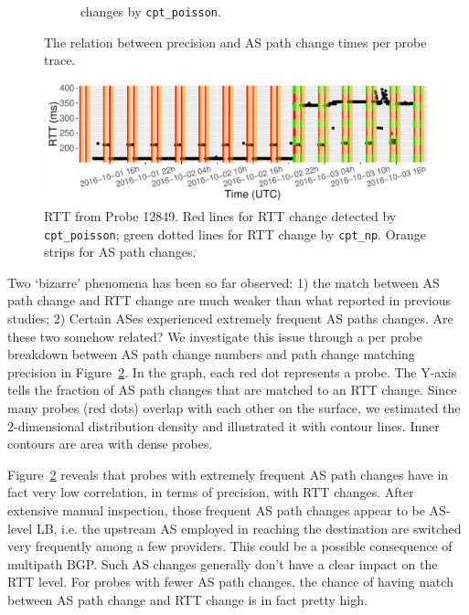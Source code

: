 \begin{figure}[!htb]
\begin{subfigure}[b]{.48\textwidth}
	\caption{\footnotesize changes by \texttt{cpt\_poisson}.}
	\label{fig:as_path_ch_precision_poisson}
	\end{subfigure}
\caption{The relation between precision and AS path change times per probe trace.}
\label{fig:as_path_ch_precision}
\end{figure}

\begin{figure}[!htb]
\centering
\includegraphics[width=.96\textwidth]{gfx/chap4/case_12849.pdf}
\caption{RTT from Probe 12849. Red lines for RTT change detected by \texttt{cpt\_poisson}; green dotted lines for RTT change by \texttt{cpt\_np}. Orange strips for AS path changes.}
\label{fig:case_12849_rtt}
\end{figure}

Two `bizarre' phenomena has been so far observed: 1) the match between AS path change and RTT change are much weaker than what reported in previous studies; 2) Certain ASes experienced extremely frequent AS paths changes.
Are these two somehow related? 
We investigate this issue through a per probe breakdown between AS path change numbers and path change matching precision in Figure~\ref{fig:as_path_ch_precision}.
In the graph, each red dot represents a probe. The Y-axis tells the fraction of AS path changes that are matched to an RTT change.
Since many probes (red dots) overlap with each other on the surface, we estimated the 2-dimensional distribution density and illustrated it with contour lines.
Inner contours are area with dense probes.

Figure~\ref{fig:as_path_ch_precision} reveals that probes with extremely frequent AS path changes have in fact very low correlation, in terms of precision, with RTT changes.
After extensive manual inspection, those frequent AS path changes appear to be AS-level LB, i.e. the upstream AS employed in reaching the destination are switched very frequently among a few providers.
This could be a possible consequence of multipath BGP.
Such AS changes generally don't have a clear impact on the RTT level. 
For probes with fewer AS path changes, the chance of having match between AS path change and RTT change is in fact pretty high.

